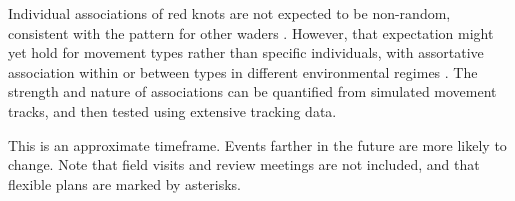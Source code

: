Individual associations of red knots are not expected to be non-random, consistent with the pattern for other waders \citep{myers1983, conklin2008}. However, that expectation might yet hold for movement types rather than specific individuals, with assortative association within or between types in different environmental regimes \citep{spiegel2017}. The strength and nature of associations can be quantified from simulated movement tracks, and then tested using extensive tracking data.

\newpage



This is an approximate timeframe. Events farther in the future are more likely to change. Note that field visits and review meetings are not included, and that flexible plans are marked by asterisks.


